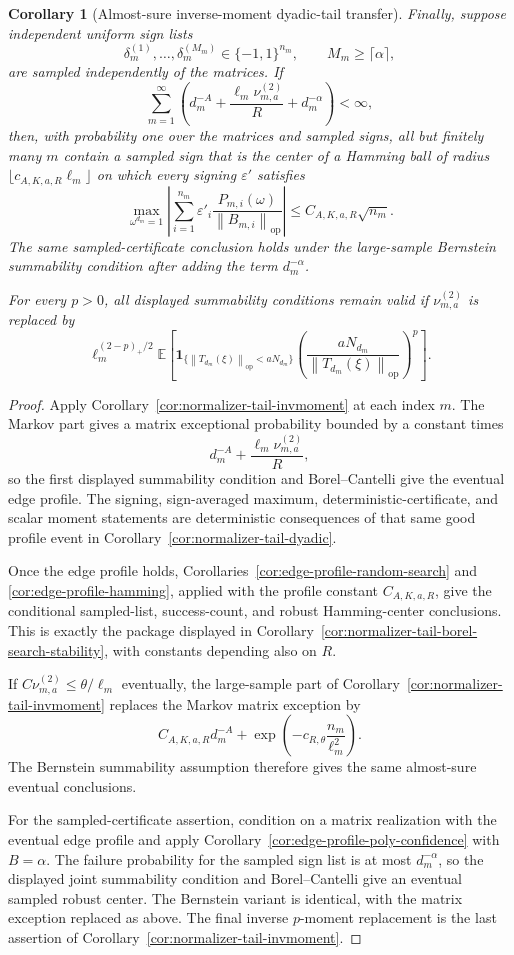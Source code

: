 \documentclass[11pt]{amsart}
\numberwithin{equation}{section}
\newtheorem{corollary}[theorem]{Corollary}
\theoremstyle{definition}
\theoremstyle{remark}
\newcommand{\op}{\mathrm{op}}
\newcommand{\Exp}{\mathbb E}
\newcommand{\norm}[1]{\left\lVert #1\right\rVert}
\newcommand{\eps}{\varepsilon}
\begin{document}
\begin{corollary}[Almost-sure inverse-moment dyadic-tail transfer]
Finally, suppose independent uniform sign lists
\[
  \delta_m^{(1)},\ldots,\delta_m^{(M_m)}\in\{-1,1\}^{n_m},
  \qquad M_m\ge\lceil\alpha\rceil,
\]
are sampled independently of the matrices.  If
\[
  \sum_{m=1}^{\infty}
  \left(d_m^{-A}+\frac{\ell_m\nu_{m,a}^{(2)}}{R}+d_m^{-\alpha}\right)<\infty,
\]
then, with probability one over the matrices and sampled signs, all but
finitely many \(m\) contain a sampled sign that is the center of a Hamming ball
of radius \(\lfloor c_{A,K,a,R}\ell_m\rfloor\) on which every signing
\(\eps'\) satisfies
\[
  \max_{\omega^{d_m}=1}
  \left|\sum_{i=1}^{n_m}
  \eps'_i\frac{P_{m,i}(\omega)}{\norm{B_{m,i}}_{\op}}\right|
  \le C_{A,K,a,R}\sqrt{n_m}.
\]
The same sampled-certificate conclusion holds under the large-sample
Bernstein summability condition after adding the term \(d_m^{-\alpha}\).

For every \(p>0\), all displayed summability conditions remain valid if
\(\nu_{m,a}^{(2)}\) is replaced by
\[
  \ell_m^{(2-p)_+/2}
  \Exp\left[
  \mathbf 1_{\{\norm{T_{d_m}(\xi)}_{\op}<aN_{d_m}\}}
  \left(\frac{aN_{d_m}}{\norm{T_{d_m}(\xi)}_{\op}}\right)^p
  \right].
\]
\end{corollary}

\begin{proof}
Apply Corollary~\ref{cor:normalizer-tail-invmoment} at each index \(m\).  The
Markov part gives a matrix exceptional probability bounded by a constant times
\[
  d_m^{-A}+\frac{\ell_m\nu_{m,a}^{(2)}}{R},
\]
so the first displayed summability condition and Borel--Cantelli give the
eventual edge profile.  The signing, sign-averaged maximum,
deterministic-certificate, and scalar moment statements are deterministic
consequences of that same good profile event in
Corollary~\ref{cor:normalizer-tail-dyadic}.

Once the edge profile holds, Corollaries~\ref{cor:edge-profile-random-search}
and \ref{cor:edge-profile-hamming}, applied with the profile constant
\(C_{A,K,a,R}\), give the conditional sampled-list, success-count, and robust
Hamming-center conclusions.  This is exactly the package displayed in
Corollary~\ref{cor:normalizer-tail-borel-search-stability}, with constants
depending also on \(R\).

If \(C\nu_{m,a}^{(2)}\le\theta/\ell_m\) eventually, the large-sample part of
Corollary~\ref{cor:normalizer-tail-invmoment} replaces the Markov matrix
exception by
\[
  C_{A,K,a,R}d_m^{-A}
  +\exp\left(-c_{R,\theta}\frac{n_m}{\ell_m^2}\right).
\]
The Bernstein summability assumption therefore gives the same almost-sure
eventual conclusions.

For the sampled-certificate assertion, condition on a matrix realization with
the eventual edge profile and apply
Corollary~\ref{cor:edge-profile-poly-confidence} with \(B=\alpha\).  The
failure probability for the sampled sign list is at most \(d_m^{-\alpha}\), so
the displayed joint summability condition and Borel--Cantelli give an eventual
sampled robust center.  The Bernstein variant is identical, with the matrix
exception replaced as above.  The final inverse \(p\)-moment replacement is the
last assertion of Corollary~\ref{cor:normalizer-tail-invmoment}.
\end{proof}
\end{document}
